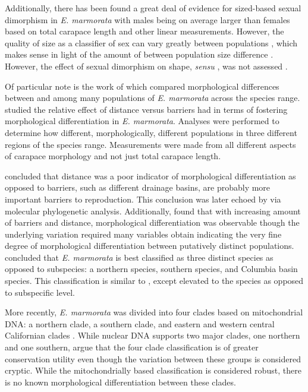 \documentclass[12pt,letterpaper]{article}\usepackage{graphicx, color}
\begin{document}
Additionally, there has been found a great deal of evidence for sized-based sexual dimorphism in \textit{E. marmorata} \citep{Lubcke2007,Germano2009,Holland1992} with males being on average larger than females based on total carapace length and other linear measurements. However, the quality of size as a classifier of sex can vary greatly between populations \citep{Holland1992}, which makes sense in light of the amount of between population size difference \citep{Lubcke2007,Germano2009}. However, the effect of sexual dimorphism on shape, \textit{sensu} \citet{Kendall1977a}, was not assessed \citep{Holland1992,Lubcke2007,Germano2008}.

Of particular note is the work of \citet{Holland1992} which compared morphological differences between and among many populations of \textit{E. marmorata} across the species range. \citet{Holland1992} studied the relative effect of distance versus barriers had in terms of fostering morphological differentiation in \textit{E. marmorata}. Analyses were performed to determine how different, morphologically, different populations in three different regions of the species range. Measurements were made from all different aspects of carapace morphology and not just total carapace length. 

\citet{Holland1992} concluded that distance was a poor indicator of morphological differentiation as opposed to barriers, such as different drainage basins, are probably more important barriers to reproduction. This conclusion was later echoed by \citet{Spinks2005} via molecular phylogenetic analysis. Additionally, \citet{Holland1992} found that with increasing amount of barriers and distance, morphological differentiation was observable though the underlying variation required many variables obtain indicating the very fine degree of morphological differentiation between putatively distinct populations. \citet{Holland1992} concluded that \textit{E. marmorata} is best classified as three distinct species as opposed to subspecies: a northern species, southern species, and Columbia basin species. This classification is similar to \citet{Seeliger1945}, except elevated to the species as opposed to subspecific level.

More recently, \textit{E. marmorata} was divided into four clades based on mitochondrial DNA: a northern clade, a southern clade, and eastern and western central Californian clades \citep{Spinks2005,Spinks2010}. While nuclear DNA supports two major clades, one northern and one southern, \citet{Spinks2010} argue that the four clade classification is of greater conservation utility even though the variation between these groups is considered cryptic. 
While the mitochondrially based classification is considered robust, there is no known morphological differentiation between these clades.
\end{document}
